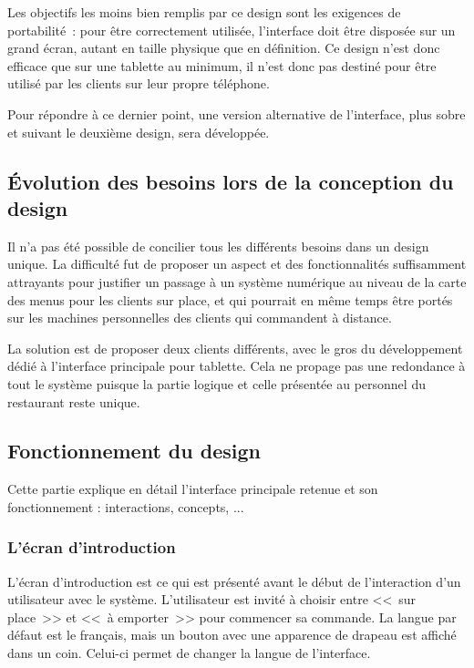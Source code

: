 \documentclass[a4paper,12pt]{article}
\begin{document}
Les objectifs les moins bien remplis par ce design sont les exigences de portabilité~: pour être correctement utilisée,
l'interface doit être disposée sur un grand écran, autant en taille physique que en définition. Ce design n'est donc
efficace que sur une tablette au minimum, il n'est donc pas destiné pour être utilisé par les clients sur leur propre
téléphone.

Pour répondre à ce dernier point, une version alternative de l'interface, plus sobre et suivant le deuxième design,
sera développée.

\subsection{Évolution des besoins lors de la conception du design}

Il n'a pas été possible de concilier tous les différents besoins dans un design unique. La difficulté fut de proposer
un aspect et des fonctionnalités suffisamment attrayants pour justifier un passage à un système numérique au niveau
de la carte des menus pour les clients sur place, et qui pourrait en même temps être portés sur les machines
personnelles des clients qui commandent à distance.

La solution est de proposer deux clients différents, avec le gros du développement dédié à l'interface principale
pour tablette. Cela ne propage pas une redondance à tout le système puisque la partie logique et celle présentée
au personnel du restaurant reste unique.

\subsection{Fonctionnement du design}

Cette partie explique en détail l'interface principale retenue et son fonctionnement : interactions, concepts, ...

\subsubsection{L'écran d'introduction}

L'écran d'introduction est ce qui est présenté avant le début de l'interaction d'un utilisateur avec le système.
L'utilisateur est invité à choisir entre <<~sur place~>> et <<~à emporter~>> pour commencer sa commande. La langue par
défaut est le français, mais un bouton avec une apparence de drapeau est affiché dans un coin. Celui-ci permet de
changer la langue de l'interface.
\end{document}

